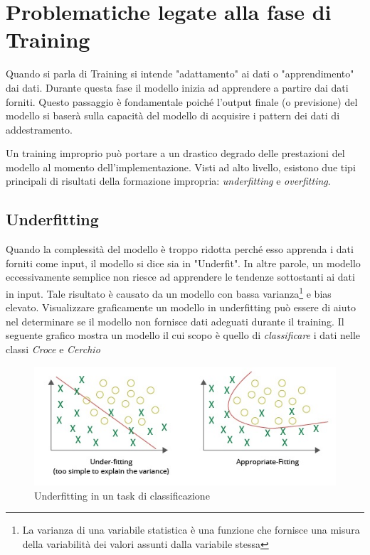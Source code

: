 \section{Problematiche legate alla fase di Training}

Quando si parla di Training si intende "adattamento" ai dati o "apprendimento" dai dati. Durante questa fase il modello inizia ad apprendere a partire dai dati forniti. Questo passaggio è fondamentale poiché l'output finale (o previsione) del modello si baserà sulla capacità del modello di acquisire i pattern dei dati di addestramento.

Un training improprio può portare a un drastico degrado delle prestazioni del modello al momento dell'implementazione. Visti ad alto livello, esistono due tipi principali di risultati della formazione impropria: \emph{underfitting} e \emph{overfitting}.

\subsection{Underfitting}
Quando la complessità del modello è troppo ridotta perché esso apprenda i dati forniti come input, il modello si dice sia in "Underfit". In altre parole, un modello eccessivamente semplice non riesce ad apprendere le tendenze sottostanti ai dati in input. Tale risultato è causato da un modello con bassa varianza\footnote{La varianza di una variabile statistica è una funzione che fornisce una misura della variabilità dei valori assunti dalla variabile stessa} e bias elevato.\newline
Visualizzare graficamente un modello in underfitting può essere di aiuto nel determinare se il modello non fornisce dati adeguati durante il training.
Il seguente grafico mostra un modello il cui scopo è quello di \emph{classificare} i dati nelle classi \textit{Croce} e \textit{Cerchio}

\begin{figure}[h!]
	\centering
	\includegraphics[width=120mm]{img/2/underover_1_1}
	\caption{\fontsize{10px}{0mm}\selectfont Underfitting in un task di classificazione\label{fig:underover_1_1}}
\end{figure}
\newpage
